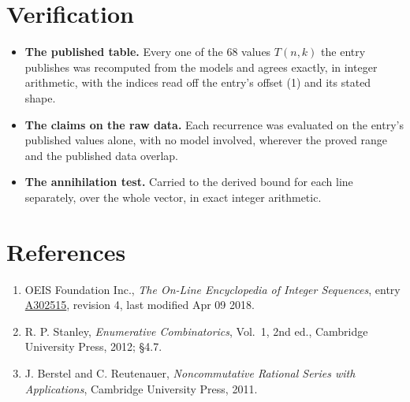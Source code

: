 \documentclass[11pt]{article}
\theoremstyle{definition}
\begin{document}
\section{Verification}

\begin{itemize}

\item {\bfseries The published table.} Every one of the 68 values $T(n,k)$ the entry publishes was recomputed from the models and agrees exactly, in integer arithmetic, with the indices read off the entry's offset (1) and its stated shape.

\item {\bfseries The claims on the raw data.} Each recurrence was evaluated on the entry's published values alone, with no model involved, wherever the proved range and the published data overlap.

\item {\bfseries The annihilation test.} Carried to the derived bound for each line separately, over the whole vector, in exact integer arithmetic.

\end{itemize}

\section{References}

\begin{enumerate}

\item OEIS Foundation Inc., \emph{The On-Line Encyclopedia of Integer Sequences}, entry \href{https://oeis.org/A302515}{A302515}, revision 4, last modified Apr 09 2018.

\item R. P. Stanley, \emph{Enumerative Combinatorics}, Vol.~1, 2nd ed., Cambridge University Press, 2012; \S4.7.

\item J. Berstel and C. Reutenauer, \emph{Noncommutative Rational Series with Applications}, Cambridge University Press, 2011.

\end{enumerate}
\end{document}

